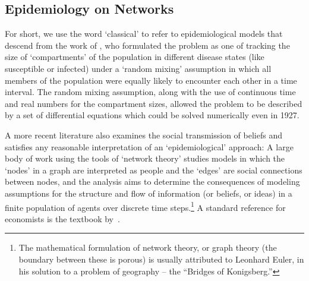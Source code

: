 \begin{comment}

\end{comment}

\subsection{Epidemiology on Networks}

    For short, we use the word `classical' to refer to epidemiological models that descend from the work of \cite{kermack_contribution_1927}, who formulated the problem as one of tracking the size of `compartments' of the population in different disease states (like susceptible or infected) under a `random mixing' assumption in which all members of the population were equally likely to encounter each other in a time interval.  The random mixing assumption, along with the use of continuous time and real numbers for the compartment sizes, allowed the problem to be described by a set of differential equations which could be solved numerically even in 1927.

    A more recent literature also examines the social transmission of beliefs and satisfies any reasonable interpretation of  an `epidemiological' approach:  A large body of work using the tools of `network theory' studies models in which the `nodes' in a graph are interpreted as people and the `edges' are social connections between nodes, and the analysis aims to determine the consequences of modeling assumptions for the structure and flow of information (or beliefs, or ideas) in a finite population of agents over discrete time steps.\footnote{The mathematical formulation of network theory, or graph theory (the boundary between these is porous) is usually attributed to Leonhard Euler, in his solution to a problem of geography -- the ``Bridges of Konigsberg.''}  A standard reference for economists is the textbook by~\cite{jackson_social_2010}.


